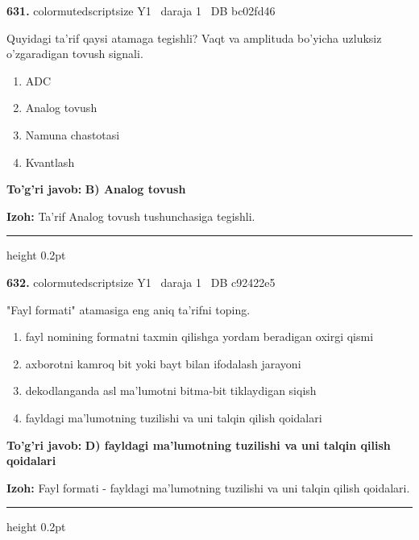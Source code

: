 \documentclass[10pt,a4paper,oneside]{article}
\begin{document}
\noindent\textbf{\color{ink}631.}  {color{muted}scriptsize Y1 \textbullet\ daraja 1 \textbullet\ DB bc02fd46}
\par
Quyidagi ta'rif qaysi atamaga tegishli? Vaqt va amplituda bo'yicha uzluksiz o'zgaradigan tovush signali.
\begin{enumerate}[label=\Alph*),leftmargin=9mm]
\item ADC
\item Analog tovush
\item Namuna chastotasi
\item Kvantlash
\end{enumerate}
\begin{tcolorbox}[enhanced,breakable,colback=teal!4,colframe=teal!50!black,boxrule=0.5pt,arc=1.1mm,left=3mm,right=3mm,top=1.7mm,bottom=1.7mm,before skip=2mm,after skip=2mm]
\textbf{\color{teal}To'g'ri javob:} \textbf{B) Analog tovush}
\par\smallskip
\textbf{Izoh:} Ta'rif Analog tovush tushunchasiga tegishli.
\end{tcolorbox}
\vspace{2mm}\hrule height 0.2pt \vspace{3mm}

\noindent\textbf{\color{ink}632.}  {color{muted}scriptsize Y1 \textbullet\ daraja 1 \textbullet\ DB c92422e5}
\par
"Fayl formati" atamasiga eng aniq ta'rifni toping.
\begin{enumerate}[label=\Alph*),leftmargin=9mm]
\item fayl nomining formatni taxmin qilishga yordam beradigan oxirgi qismi
\item axborotni kamroq bit yoki bayt bilan ifodalash jarayoni
\item dekodlanganda asl ma'lumotni bitma-bit tiklaydigan siqish
\item fayldagi ma'lumotning tuzilishi va uni talqin qilish qoidalari
\end{enumerate}
\begin{tcolorbox}[enhanced,breakable,colback=teal!4,colframe=teal!50!black,boxrule=0.5pt,arc=1.1mm,left=3mm,right=3mm,top=1.7mm,bottom=1.7mm,before skip=2mm,after skip=2mm]
\textbf{\color{teal}To'g'ri javob:} \textbf{D) fayldagi ma'lumotning tuzilishi va uni talqin qilish qoidalari}
\par\smallskip
\textbf{Izoh:} Fayl formati - fayldagi ma'lumotning tuzilishi va uni talqin qilish qoidalari.
\end{tcolorbox}
\vspace{2mm}\hrule height 0.2pt \vspace{3mm}
\end{document}
